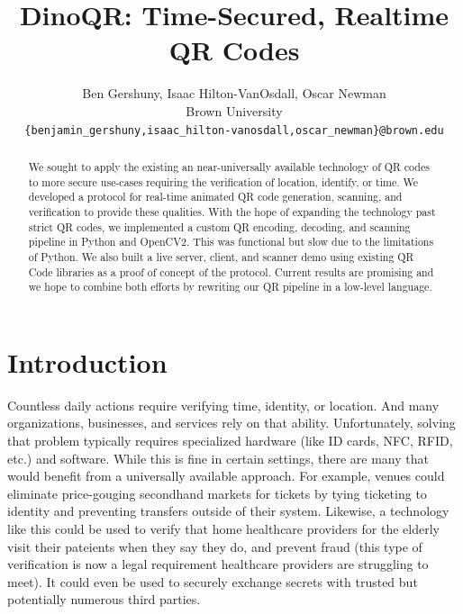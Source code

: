 \documentclass[10pt,twocolumn,letterpaper]{article}
\begin{document}
\title{DinoQR: Time-Secured, Realtime QR Codes}

\author{
Ben Gershuny, Isaac Hilton-VanOsdall, Oscar Newman\\
Brown University\\
{\tt\small \{benjamin\_gershuny,isaac\_hilton-vanosdall,oscar\_newman\}@brown.edu}
}

\maketitle

\begin{abstract}
   We sought to apply the existing an near-universally available technology of QR codes to more secure use-cases requiring the verification of location, identify, or time. We developed a protocol for real-time animated QR code generation, scanning, and verification to provide these qualities. With the hope of expanding the technology past strict QR codes, we implemented a custom QR encoding, decoding, and scanning pipeline in Python and OpenCV2. This was functional but slow due to the limitations of Python. We also built a live server, client, and scanner demo using existing QR Code libraries as a proof of concept of the protocol. Current results are promising and we hope to combine both efforts by rewriting our QR pipeline in a low-level language.
\end{abstract}

\section{Introduction}
Countless daily actions require verifying time, identity, or location. And many organizations, businesses, and services rely on that ability. Unfortunately, solving that problem typically requires specialized hardware (like ID cards, NFC, RFID, etc.) and software. While this is fine in certain settings, there are many that would benefit from a universally available approach. For example, venues could eliminate price-gouging secondhand markets for tickets by tying ticketing to identity and preventing transfers outside of their system. Likewise, a technology like this could be used to verify that home healthcare providers for the elderly visit their pateients when they say they do, and prevent fraud (this type of verification is now a legal requirement healthcare providers are struggling to meet). It could even be used to securely exchange secrets with trusted but potentially numerous third parties.
\end{document}
